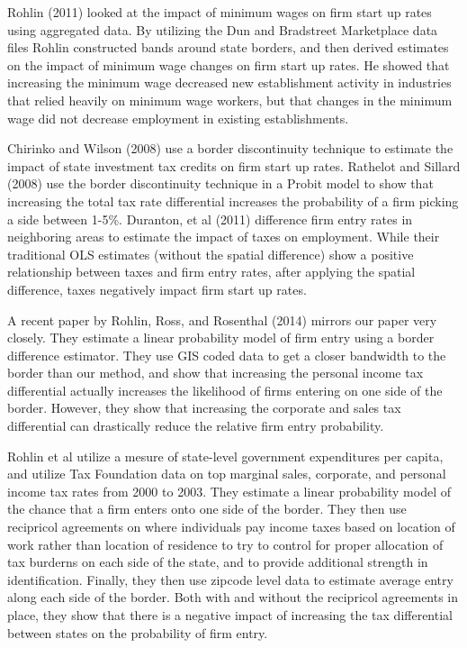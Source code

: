 Rohlin (2011) looked at the impact of minimum wages on firm start up rates using aggregated data. By utilizing the Dun and Bradstreet Marketplace data files Rohlin constructed bands around state borders, and then derived estimates on the impact of minimum wage changes on firm start up rates. He showed that increasing the minimum wage decreased new establishment activity in industries that relied heavily on minimum wage workers, but that changes in the minimum wage did not decrease employment in existing establishments. 

Chirinko and Wilson (2008) use a border discontinuity technique to estimate the impact of state investment tax credits on firm start up rates. Rathelot and Sillard (2008) use the border discontinuity technique in a Probit model to show that increasing the total tax rate differential increases the probability of a firm picking a side between 1-5\%. Duranton, et al (2011)  difference firm entry rates in neighboring areas to estimate the impact of taxes on employment. While their  traditional OLS estimates (without the spatial difference)  show a positive relationship between taxes and firm entry rates, after applying the spatial difference, taxes negatively impact firm start up rates. 

A recent paper by Rohlin, Ross, and Rosenthal (2014) mirrors our paper very closely. They estimate a linear probability model of firm entry using a border difference estimator. They use GIS coded data to get a closer bandwidth to the border than our method, and show that increasing the personal income tax differential actually increases the likelihood of firms entering on one side of the border. However, they show that increasing the corporate and sales tax differential can drastically reduce the relative firm entry probability.

Rohlin et al utilize a mesure of state-level government expenditures per capita, and utilize Tax Foundation data on top marginal sales, corporate, and personal income tax rates from 2000 to 2003. They estimate a linear probability model of the chance that a firm enters onto one side of the border. They then use recipricol agreements on where individuals pay income taxes based on location of work rather than location of residence to try to control for proper allocation of tax burderns on each side of the state, and to provide additional strength in identification. Finally, they then use zipcode level data to estimate average entry along each side of the border. Both with and without the recipricol agreements in place, they show that there is a negative impact of increasing the tax differential between states on the probability of firm entry.

